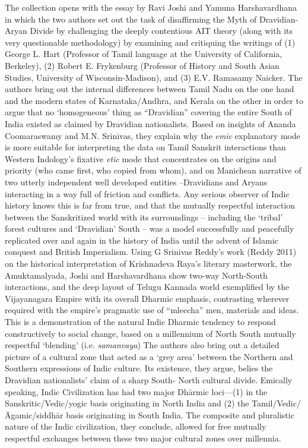 The collection opens with the essay by Ravi Joshi and Yamuna Harshavardhana in which the two authors set out the task of disaffirming the Myth of Dravidian-Aryan Divide by challenging the deeply contentious AIT theory (along with its very questionable methodology) by examining and critiquing the writings of (1) George L. Hart (Professor of Tamil language at the University of California, Berkeley), (2) Robert E. Frykenburg (Professor of History and South Asian Studies, University of Wisconsin-Madison), and (3) E.V. Ramasamy Naicker. The authors bring out the internal differences between Tamil Nadu on the one hand and the modern states of Karnataka/Andhra, and Kerala on the other in order to argue that no ‘homogeneous’ thing as “Dravidian” covering the entire South of India existed as claimed by Dravidian nationalists. Based on insights of Ananda Coomaraswamy and M.N. Srinivas, they explain why the \textit{emic} explanatory mode is more suitable for interpreting the data on Tamil Sanskrit interactions than Western Indology’s fixative \textit{etic} mode that concentrates on the origins and priority (who came first, who copied from whom), and on Manichean narrative of two utterly independent well developed entities –Dravidians and Aryans interacting in a way full of friction and conflicts. Any serious observer of Indic history knows this is far from true, and that the mutually respectful interaction between the Sanskritized world with its surroundings – including the ‘tribal’ forest cultures and ‘Dravidian’ South – was a model successfully and peacefully replicated over and again in the history of India until the advent of Islamic conquest and British Imperialism. Using G Srinivas Reddy's work (Reddy 2011) on the historical interpretation of Krishnadeva Raya’s literary masterwork, the Amuktamalyada, Joshi and Harshavardhana show two-way North-South interactions, and the deep layout of Telugu Kannada world exemplified by the Vijayanagara Empire with its overall Dharmic emphasis, contrasting wherever required with the empire’s pragmatic use of “mleccha” men, materials and ideas. This is a demonstration of the natural Indic Dharmic tendency to respond constructively to social change, based on a millennium of North South mutually respectful ‘blending' (i.e. \textit{samanvaya}) The authors also bring out a detailed picture of a cultural zone that acted as a ‘grey area' between the Northern and Southern expressions of Indic culture. Its existence, they argue, belies the Dravidian nationalists’ claim of a sharp South- North cultural divide. Emically speaking, Indic Civilization has had two major Dhārmic loci—(1) in the Sanskritic/Vedic/yogic basis originating in North India and (2) the Tamil/Vedic/Āgamic/siddhār basis originating in South India. The composite and pluralistic nature of the Indic civilization, they conclude, allowed for free mutually respectful exchanges between these two major cultural zones over millennia.

